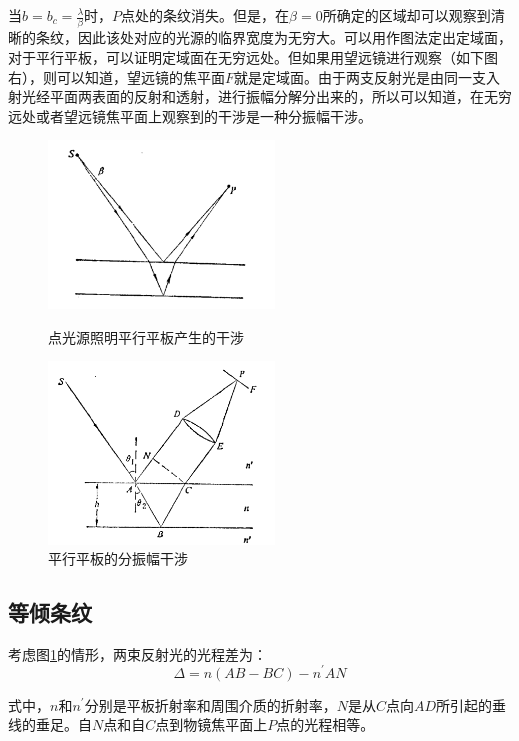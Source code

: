 \documentclass[UTF8]{ctexart}
\begin{document}
	当$ b=b_{c}=\frac{\lambda}{\beta} $时，$ P $点处的条纹消失。但是，在$ \beta=0 $所确定的区域却可以观察到清晰的条纹，因此该处对应的光源的临界宽度为无穷大。可以用作图法定出定域面，对于平行平板，可以证明定域面在无穷远处。但如果用望远镜进行观察（如下图右），则可以知道，望远镜的焦平面$ F $就是定域面。由于两支反射光是由同一支入射光经平面两表面的反射和透射，进行振幅分解分出来的，所以可以知道，在无穷远处或者望远镜焦平面上观察到的干涉是一种分振幅干涉。
	\begin{figure}[ht]
		\centering
		\begin{minipage}[t]{0.48 \textwidth}
			\centering
			\includegraphics[width=6cm]{point_light.png}
			\caption{点光源照明平行平板产生的干涉}
		\end{minipage}
		\begin{minipage}[t]{0.48 \textwidth}
			\centering
			\includegraphics[width=6cm]{extern_light.png}
			\caption{平行平板的分振幅干涉}
			\label{figure_parallel}
		\end{minipage}
	\end{figure}

	\subsection{等倾条纹}
	考虑图\ref{figure_parallel}的情形，两束反射光的光程差为：
	\begin{equation}
		\Delta =n (AB-BC)-n^{\prime} AN
	\end{equation}
	
\noindent 式中，$ n $和$ n^{\prime} $分别是平板折射率和周围介质的折射率，$ N $是从$ C $点向$ AD $所引起的垂线的垂足。自$ N $点和自$ C $点到物镜焦平面上$ P $点的光程相等。
\end{document}
